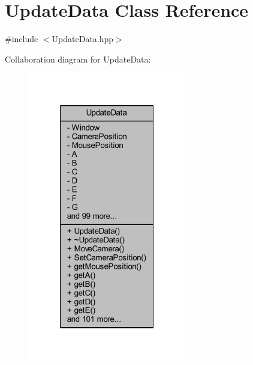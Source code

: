 \hypertarget{class_update_data}{\section{Update\-Data Class Reference}
\label{class_update_data}
}


{\ttfamily \#include $<$Update\-Data.\-hpp$>$}



Collaboration diagram for Update\-Data\-:
\nopagebreak
\begin{figure}[H]
\begin{center}
\leavevmode
\includegraphics[width=196pt]{class_update_data__coll__graph}
\end{center}
\end{figure}
